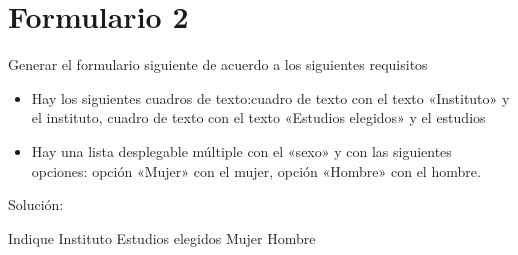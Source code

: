 \documentclass[letterpaper,10pt,spanish]{sphinxmanual}
\begin{document}
\section{Formulario 2}
\label{\detokenize{ejercicios/formularios/anexo_formularios:formulario-2}}
Generar el formulario siguiente de acuerdo a los siguientes requisitos
\begin{itemize}
\item {} 
Hay los siguientes cuadros de texto:cuadro de texto con el texto «Instituto» y el  instituto, cuadro de texto con el texto «Estudios elegidos» y el  estudios

\item {} 
Hay una lista desplegable múltiple con el  «sexo» y con las siguientes opciones: opción «Mujer» con el  mujer, opción «Hombre» con el  hombre.

\end{itemize}


Solución:

\begin{sphinxVerbatim}[commandchars=\\\{\}]
  Indique
  Instituto  
  Estudios elegidos  
    
     Mujer
     Hombre
\end{sphinxVerbatim}
\end{document}

